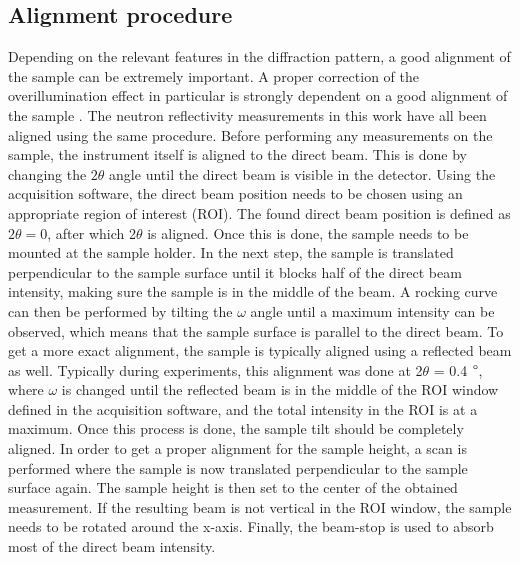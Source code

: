 \subsection{Alignment procedure}
Depending on the relevant features in the diffraction pattern, a good alignment of the sample can be extremely important. A proper correction of the overillumination effect in particular is strongly dependent on a good alignment of the sample \cite{footprintnew}. The neutron reflectivity measurements in this work have all been aligned using the same procedure. Before performing any measurements on the sample, the instrument itself is aligned to the direct beam. This is done by changing the $2\theta$ angle until the direct beam is visible in the detector. Using the acquisition software, the direct beam position needs to be chosen using an appropriate region of interest (ROI). The found direct beam position is defined as $2\theta = 0$, after which 2$\theta$ is aligned. Once this is done, the sample needs to be mounted at the sample holder. In the next step, the sample is translated perpendicular to the sample surface until it blocks half of the direct beam intensity, making sure the sample is in the middle of the beam. A rocking curve can then be performed by tilting the $\omega$ angle until a maximum intensity can be observed, which means that the sample surface is parallel to the direct beam. To get a more exact alignment, the sample is typically aligned using a reflected beam as well. Typically during experiments, this alignment was done at 2$\theta$ = 0.4 $\degree$, where  $\omega$ is changed until the reflected beam is in the middle of the ROI window defined in the acquisition software, and the total intensity in the ROI is at a maximum. Once this process is done, the sample tilt should be completely aligned. In order to get a proper alignment for the sample height, a scan is performed where the sample is now translated perpendicular to the sample surface again. The sample height is then set to the center of the obtained measurement. If the resulting beam is not vertical in the ROI window, the sample needs to be rotated around the x-axis. Finally, the beam-stop is used to absorb most of the direct beam intensity.
